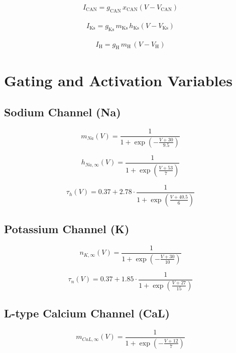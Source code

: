 \documentclass{article}
\begin{document}
\begin{align}
I_\mathrm{CAN} = g_\mathrm{CAN} \, x_\mathrm{CAN} (V - V_\mathrm{CAN})
\end{align}

\begin{align}
I_\mathrm{Ks} = g_\mathrm{Ks} \, m_\mathrm{Ks} \, h_\mathrm{Ks} (V - V_\mathrm{Ks})
\end{align}

\begin{align}
I_\mathrm{H} = g_\mathrm{H} \, m_\mathrm{H} \, (V - V_\mathrm{H})
\end{align}

\section*{Gating and Activation Variables}

\subsection*{Sodium Channel (Na)}
\begin{equation}
m_{Na}(V) = \frac{1}{1 + \exp\left(-\frac{V + 30}{9.5}\right)}
\end{equation}

\begin{equation}
h_{Na,\infty}(V) = \frac{1}{1 + \exp\left(\frac{V + 53}{7}\right)}
\end{equation}

\begin{equation}
\tau_h(V) = 0.37 + 2.78 \cdot \frac{1}{1 + \exp\left(\frac{V + 40.5}{6}\right)}
\end{equation}

\subsection*{Potassium Channel (K)}
\begin{equation}
n_{K,\infty}(V) = \frac{1}{1 + \exp\left(-\frac{V + 30}{10}\right)}
\end{equation}

\begin{equation}
\tau_n(V) = 0.37 + 1.85 \cdot \frac{1}{1 + \exp\left(\frac{V + 27}{15}\right)}
\end{equation}

\subsection*{L-type Calcium Channel (CaL)}
\begin{equation}
m_{CaL,\infty}(V) = \frac{1}{1 + \exp\left(-\frac{V + 12}{7}\right)}
\end{equation}
\end{document}
